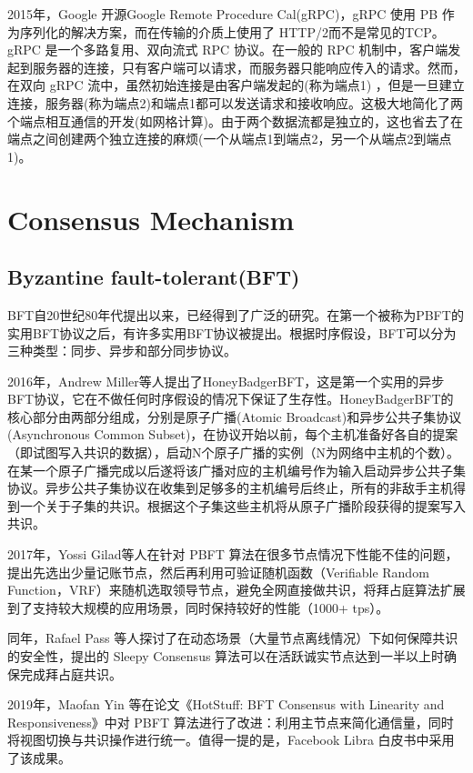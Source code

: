 \documentclass[a4paper,twoside]{scrbook}
\begin{document}
\begin{CJK}{UTF8}{gbsn}
2015年，Google 开源Google Remote Procedure Cal(gRPC)，gRPC 使用 PB 作为序列化的解决方案，而在传输的介质上使用了 HTTP/2而不是常见的TCP。gRPC 是一个多路复用、双向流式 RPC 协议。在一般的 RPC 机制中，客户端发起到服务器的连接，只有客户端可以请求，而服务器只能响应传入的请求。然而，在双向 gRPC 流中，虽然初始连接是由客户端发起的(称为端点1) ，但是一旦建立连接，服务器(称为端点2)和端点1都可以发送请求和接收响应。这极大地简化了两个端点相互通信的开发(如网格计算)。由于两个数据流都是独立的，这也省去了在端点之间创建两个独立连接的麻烦(一个从端点1到端点2，另一个从端点2到端点1)。

\section{Consensus Mechanism}
\subsection{Byzantine fault-tolerant(BFT)}
BFT自20世纪80年代提出以来\cite{lamport1982byzantine}，已经得到了广泛的研究。在第一个被称为PBFT\cite{castro2002practical}的实用BFT协议之后，有许多实用BFT协议被提出。根据时序假设，BFT可以分为三种类型：同步、异步和部分同步协议。

2016年，Andrew Miller等人提出了HoneyBadgerBFT\cite{miller2016honey}，这是第一个实用的异步BFT协议，它在不做任何时序假设的情况下保证了生存性。HoneyBadgerBFT的核心部分由两部分组成，分别是原子广播(Atomic Broadcast)和异步公共子集协议(Asynchronous Common Subset)，在协议开始以前，每个主机准备好各自的提案（即试图写入共识的数据），启动N个原子广播的实例（N为网络中主机的个数）。在某一个原子广播完成以后遂将该广播对应的主机编号作为输入启动异步公共子集协议。异步公共子集协议在收集到足够多的主机编号后终止，所有的非敌手主机得到一个关于子集的共识。根据这个子集这些主机将从原子广播阶段获得的提案写入共识。

2017年，Yossi Gilad\cite{gilad2017algorand}等人在针对 PBFT 算法在很多节点情况下性能不佳的问题，提出先选出少量记账节点，然后再利用可验证随机函数（Verifiable Random Function，VRF）来随机选取领导节点，避免全网直接做共识，将拜占庭算法扩展到了支持较大规模的应用场景，同时保持较好的性能（1000+ tps）。

同年，Rafael Pass \cite{pass2017sleepy}等人探讨了在动态场景（大量节点离线情况）下如何保障共识的安全性，提出的 Sleepy Consensus 算法可以在活跃诚实节点达到一半以上时确保完成拜占庭共识。

2019年，Maofan Yin 等在论文《HotStuff: BFT Consensus with Linearity and Responsiveness》\cite{yin2019hotstuff}中对 PBFT 算法进行了改进：利用主节点来简化通信量，同时将视图切换与共识操作进行统一。值得一提的是，Facebook Libra 白皮书中采用了该成果。


\end{CJK}
\end{document}
